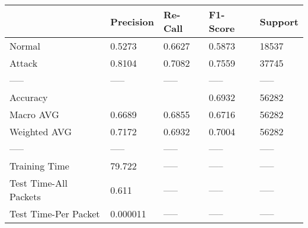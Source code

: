 \begin{tabular}{lllll}
\toprule
{} & Precision & Re-Call & F1-Score & Support \\
\midrule
Normal                &    0.5273 &  0.6627 &   0.5873 &   18537 \\
Attack                &    0.8104 &  0.7082 &   0.7559 &   37745 \\
-----                 &     ----- &   ----- &    ----- &   ----- \\
Accuracy              &           &         &   0.6932 &   56282 \\
Macro AVG             &    0.6689 &  0.6855 &   0.6716 &   56282 \\
Weighted AVG          &    0.7172 &  0.6932 &   0.7004 &   56282 \\
-----                 &     ----- &   ----- &    ----- &   ----- \\
Training Time         &    79.722 &   ----- &    ----- &   ----- \\
Test Time-All Packets &     0.611 &   ----- &    ----- &   ----- \\
Test Time-Per Packet  &  0.000011 &   ----- &    ----- &   ----- \\
\bottomrule
\end{tabular}
